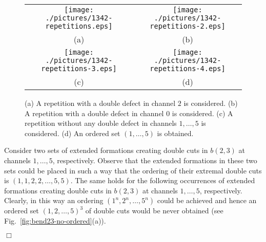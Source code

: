 \documentclass[a4paper,10pt]{llncs}
\renewenvironment{proof}
{{\bf Proof:}}{\hspace*{\fill}$\Box$\par\vspace{2mm}}
\begin{document}
\begin{proof}
\begin{figure}[htb]
\begin{center}
\begin{tabular}{cc}
\mbox{\texttt{[image: ./pictures/1342-repetitions.eps]}} \hspace{0.1cm} &
\mbox{\texttt{[image: ./pictures/1342-repetitions-2.eps]}} \\
(a) & (b)\\
\mbox{\texttt{[image: ./pictures/1342-repetitions-3.eps]}} \hspace{0.1cm} &
\mbox{\texttt{[image: ./pictures/1342-repetitions-4.eps]}} \\
(c) & (d)\\
\end{tabular}
\caption{(a) A repetition with a double defect in channel $2$ is considered. (b) A repetition with a double defect in channel $0$ is considered. (c) A repetition without any double defect in channels $1,\dots,5$ is considered. (d) An ordered set $(1,\dots,5)$ is obtained.}\label{fig:1342-repetitions}
\end{center}
\end{figure}

Consider two sets of extended formations creating double cuts in $b(2,3)$ at channels $1, \dots, 5$, respectively. Observe that the extended formations in these two sets could be placed in such a way that the ordering of their extremal double cuts is $(1,1,2,2,\dots,5,5)$. The same holds for the following occurrences of extended formations creating double cuts in $b(2,3)$ at channels $1, \dots, 5$, respectively. Clearly, in this way an ordering $(1^n,2^n,\ldots ,5^n)$ could be achieved and hence an ordered set $(1,2,\ldots ,5)^3$ of double cuts would be never obtained (see Fig.~\ref{fig:bend23-no-ordered}(a)).


\end{proof}
\end{document}
